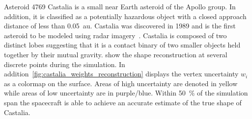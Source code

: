 \documentclass[letterpaper, paper,11pt]{AAS}		%
\begin{document}
Asteroid 4769 Castalia is a small near Earth asteroid of the Apollo group.
In addition, it is classified as a potentially hazardous object with a closed approach distance of less than \SI{0.05}{\astronomicalunit}.
Castalia was discovered in \num{1989} and is the first asteroid to be modeled using radar imagery~\cite{hudson1994}.
Castalia is composed of two distinct lobes suggesting that it is a contact binary of two smaller objects held together by their mutual gravity.
 show the shape reconstruction at several discrete points during the simulation.
In addition~\cref{fig:castalia_weights_reconstruction} displays the vertex uncertainty \( w_i \) as a colormap on the surface. 
Areas of high uncertainty are denoted in yellow while areas of low uncertainty are in purple/blue.
Within \SI{50}{\percent} of the simulation span the spacecraft is able to achieve an accurate estimate of the true shape of Castalia.
\end{document}
